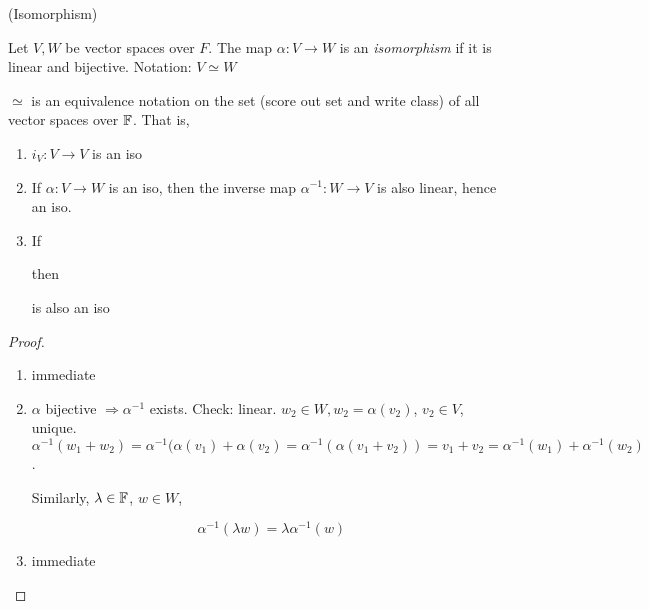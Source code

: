 \documentclass[a4paper]{article}
\begin{document}
\begin{defi} (Isomorphism)
	
	Let $ V,W $ be vector spaces over $ F $. The map $ \alpha : V \to W $ is an \emph{isomorphism} if it is linear and bijective. 
	Notation: $ V \simeq W $
\end{defi}

\begin{lemma} 
	$ \simeq $ is an equivalence notation on the set (score out set and write class) of all vector spaces over $ \mathbb{F} $. That is,
	
	\begin{enumerate}
		\item $ i_{V} : V \to V $ is an iso
		\item If $ \alpha : V \to W $ is an iso, then the inverse map $ \alpha^{-1} : W \to V $ is also linear, hence an iso.
		\item If 
		
		
		
		
	
		then 
		
		
		is also an iso 
		
	\end{enumerate}
	
\end{lemma}

\begin{proof}
	\begin{enumerate}
		\item immediate
		\item $ \alpha $ bijective $ \Rightarrow \alpha^{-1} $ exists. Check: linear. 
		$ w_{2} \in W, w_{2} = \alpha(v_{2}) $, $ v_{2} \in V $, unique.
		$ \alpha^{-1}(w_{1} + w_{2}) = \alpha^{-1}(\alpha(v_{1}) + \alpha(v_{2})  = \alpha^{-1} (\alpha(v_{1} + v_{2})) = v_{1} + v_{2} = \alpha^{-1}(w_{1})  + \alpha^{-1}(w_{2}) $.
		
		Similarly, $ \lambda \in \mathbb{F} $, $ w \in W $, 
		
		\[ \alpha^{-1} (\lambda w) = \lambda \alpha^{-1} (w) \]
		
		\item immediate
		
	\end{enumerate}
\end{proof}
\end{document}

